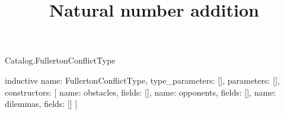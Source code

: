 \begin{lexlean}{Catalog.FullertonConflictType}
\title{Natural number addition}
\begin{semanticmodule}
inductive{
  name: FullertonConflictType,
  type_parameters: [],
  parameters: [],
  constructors: [
    {name: obstacles, fields: []},
    {name: opponents, fields: []},
    {name: dilemmas, fields: []}
  ]
}
\end{semanticmodule}
\end{lexlean}
